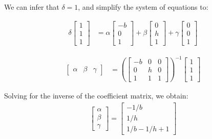 \documentclass[12pt, oneside]{article}
\begin{document}
    We can infer that $\delta = 1$, and simplify the system of equations to:
    
\begin{align*}
    \delta  \begin{bmatrix} 1   \\ 1   \\ 1   \end{bmatrix}  &= 
    \alpha \begin{bmatrix} -b   \\ 0   \\   1   \end{bmatrix} +
    \beta \begin{bmatrix} 0   \\ h   \\   1   \end{bmatrix} + 
    \gamma  \begin{bmatrix} 0  \\ 0 \\ 1  \end{bmatrix}
\end{align*} 
  
\begin{align*}
  \begin{bmatrix} \alpha & \beta & \gamma \end{bmatrix}  
  &= \left(\begin{bmatrix}
  -b    & 0     & 0   \\
  0     & h     & 0 \\
  1     & 1     & 1
  \end{bmatrix} \right) ^{-1}
  \begin{bmatrix}
  1  \\
  1   \\
  1  
  \end{bmatrix}
\end{align*} 
  
  Solving for the inverse of the coefficient matrix, we obtain:
  \begin{align*}
  \begin{bmatrix}
  \alpha \\
  \beta \\
  \gamma
  \end{bmatrix} = 
  \begin{bmatrix}
  -1 / b    \\
  1 / h   \\
  1/b - 1/h + 1
  \end{bmatrix} 
  \end{align*}
    
\end{document}

